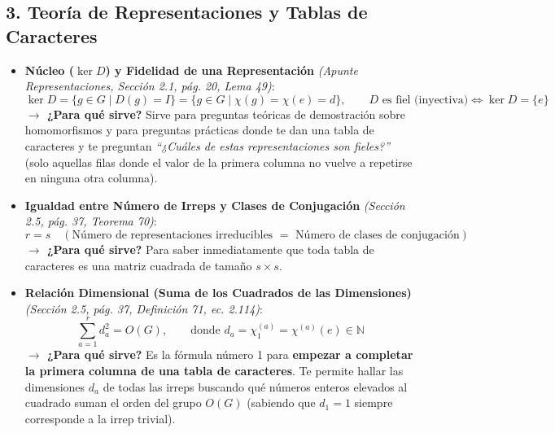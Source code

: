 \documentclass[11pt, a4paper]{article}
\begin{document}
\subsection*{3. Teoría de Representaciones y Tablas de Caracteres}

\begin{itemize}
    \item \textbf{Núcleo ($\ker D$) y Fidelidad de una Representación} \textit{(Apunte Representaciones, Sección 2.1, pág. 20, Lema 49)}:
    \[
    \ker D = \{g \in G \mid D(g) = I\} = \{g \in G \mid \chi(g) = \chi(e) = d\}, \qquad D \text{ es fiel (inyectiva)} \iff \ker D = \{e\}
    \]
    \textbf{$\rightarrow$ ¿Para qué sirve?} Sirve para preguntas teóricas de demostración sobre homomorfismos y para preguntas prácticas donde te dan una tabla de caracteres y te preguntan \textit{``¿Cuáles de estas representaciones son fieles?''} (solo aquellas filas donde el valor de la primera columna no vuelve a repetirse en ninguna otra columna).

    \item \textbf{Igualdad entre Número de Irreps y Clases de Conjugación} \textit{(Sección 2.5, pág. 37, Teorema 70)}:
    \[
    r = s \quad (\text{Número de representaciones irreducibles } = \text{ Número de clases de conjugación})
    \]
    \textbf{$\rightarrow$ ¿Para qué sirve?} Para saber inmediatamente que toda tabla de caracteres es una matriz cuadrada de tamaño $s \times s$.

    \item \textbf{Relación Dimensional (Suma de los Cuadrados de las Dimensiones)} \textit{(Sección 2.5, pág. 37, Definición 71, ec. 2.114)}:
    \[
    \sum_{a=1}^r d_a^2 = O(G), \qquad \text{donde } d_a = \chi_1^{(a)} = \chi^{(a)}(e) \in \mathbb{N}
    \]
    \textbf{$\rightarrow$ ¿Para qué sirve?} Es la fórmula número 1 para \textbf{empezar a completar la primera columna de una tabla de caracteres}. Te permite hallar las dimensiones $d_a$ de todas las irreps buscando qué números enteros elevados al cuadrado suman el orden del grupo $O(G)$ (sabiendo que $d_1 = 1$ siempre corresponde a la irrep trivial).


\end{itemize}
\end{document}
